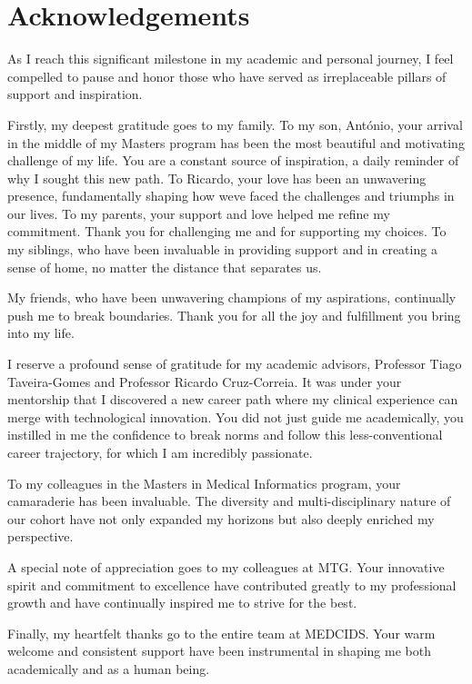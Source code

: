 \chapter*{Acknowledgements}
\thispagestyle{plain}

As I reach this significant milestone in my academic and personal
journey, I feel compelled to pause and honor those who have served as
irreplaceable pillars of support and inspiration.

Firstly, my deepest gratitude goes to my family. To my son, António,
your arrival in the middle of my Master\textquotesingle s program has
been the most beautiful and motivating challenge of my life. You are a
constant source of inspiration, a daily reminder of why I sought this
new path. To Ricardo, your love has been an unwavering presence,
fundamentally shaping how we\textquotesingle ve faced the challenges and
triumphs in our lives. To my parents, your support and love helped me
refine my commitment. Thank you for challenging me and for supporting my
choices. To my siblings, who have been invaluable in providing support
and in creating a sense of home, no matter the distance that separates
us.

My friends, who have been unwavering champions of my aspirations,
continually push me to break boundaries. Thank you for all the joy and
fulfillment you bring into my life.

I reserve a profound sense of gratitude for my academic advisors,
Professor Tiago Taveira-Gomes and Professor Ricardo Cruz-Correia. It was
under your mentorship that I discovered a new career path where my
clinical experience can merge with technological innovation. You did not
just guide me academically, you instilled in me the confidence to break
norms and follow this less-conventional career trajectory, for which I
am incredibly passionate.

To my colleagues in the Master\textquotesingle s in Medical Informatics
program, your camaraderie has been invaluable. The diversity and
multi-disciplinary nature of our cohort have not only expanded my
horizons but also deeply enriched my perspective.

A special note of appreciation goes to my colleagues at MTG. Your
innovative spirit and commitment to excellence have contributed greatly
to my professional growth and have continually inspired me to strive for
the best.

Finally, my heartfelt thanks go to the entire team at MEDCIDS. Your warm
welcome and consistent support have been instrumental in shaping me both
academically and as a human being.
